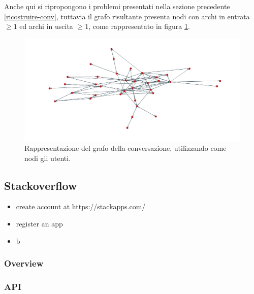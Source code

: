 Anche qui si ripropongono i problemi presentati nella sezione precedente \ref{ricostruire-conv}, tuttavia il grafo risultante presenta nodi con archi in entrata $\geq 1$ ed archi in uscita $\geq 1$, come rappresentato in figura \ref{fig:users-twitter}.

\begin{figure}[ht]
    \includegraphics[width=\linewidth]{Immagini/twitter-users.png}
    \caption{Rappresentazione del grafo della conversazione, utilizzando come nodi gli utenti.}
    \label{fig:users-twitter}
\end{figure}





\subsection {Stackoverflow} %

\begin{itemize}
    \item create account at https://stackapps.com/
    \item register an app
    \item b
\end{itemize}

\subsubsection {Overview}
\subsubsection {API}

